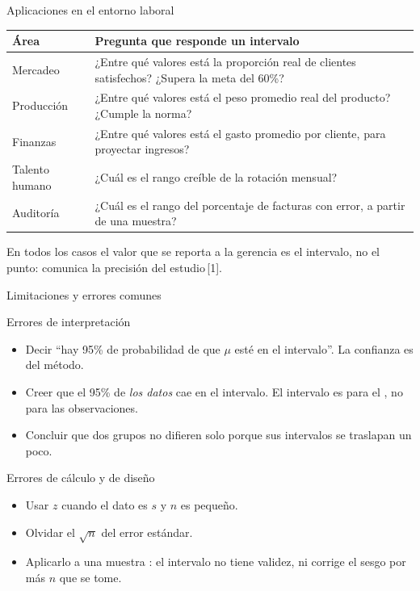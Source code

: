 \documentclass[aspectratio=169,10pt]{beamer}
\begin{document}
\begin{frame}{Aplicaciones en el entorno laboral}
  \footnotesize
  \begin{center}
  \begin{tabular}{@{}p{3.2cm}p{8.0cm}@{}}
    \toprule
    \textbf{Área} & \textbf{Pregunta que responde un intervalo} \\
    \midrule
    Mercadeo & ¿Entre qué valores está la proporción real de clientes
      satisfechos? ¿Supera la meta del 60\%? \\
    Producción & ¿Entre qué valores está el peso promedio real del producto?
      ¿Cumple la norma? \\
    Finanzas & ¿Entre qué valores está el gasto promedio por cliente, para
      proyectar ingresos? \\
    Talento humano & ¿Cuál es el rango creíble de la rotación mensual? \\
    Auditoría & ¿Cuál es el rango del porcentaje de facturas con error, a
      partir de una muestra? \\
    \bottomrule
  \end{tabular}
  \end{center}

  \vspace{0.15cm}
  {\scriptsize\color{uniGris} En todos los casos el valor que se reporta a la
  gerencia es el intervalo, no el punto: comunica la precisión del
  estudio\,[1].}
\end{frame}

\begin{frame}{Limitaciones y errores comunes}
  \small
  \begin{alertblock}{Errores de interpretación}
    \footnotesize
    \begin{itemize}
      \item Decir ``hay 95\% de probabilidad de que $\mu$ esté en el
            intervalo''. La confianza es del método.
      \item Creer que el 95\% de \emph{los datos} cae en el intervalo. El
            intervalo es para el , no para las observaciones.
      \item Concluir que dos grupos no difieren solo porque sus intervalos se
            traslapan un poco.
    \end{itemize}
  \end{alertblock}

  \begin{block}{Errores de cálculo y de diseño}
    \footnotesize
    \begin{itemize}
      \item Usar $z$ cuando el dato es $s$ y $n$ es pequeño.
      \item Olvidar el $\sqrt{n}$ del error estándar.
      \item Aplicarlo a una muestra : el intervalo
            no tiene validez, ni corrige el sesgo por más $n$ que se tome.
    \end{itemize}
  \end{block}
\end{frame}
\end{document}
